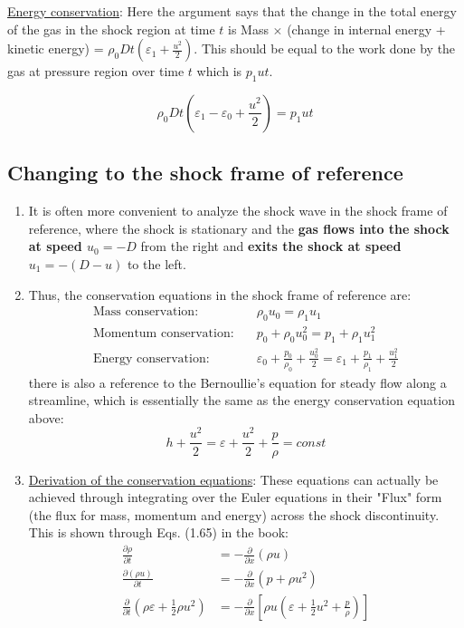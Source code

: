 ﻿\documentclass[11pt]{article}
\begin{document}
\begin{enumerate}
  \underline{Energy conservation}: \newline
  Here the argument says that the change in the total energy of the gas in the shock region at time $t$ is Mass $\times$ (change in internal energy + kinetic energy) = $\rho_0 D t \left( \varepsilon_1 + \frac{u^2}{2} \right)$. This should be equal to the work done by the gas at pressure region over time $t$ which is $p_1 u t$.
  
  \begin{equation}
    \rho_0 D t\left(\varepsilon_1 - \varepsilon_0 + \frac{u^2}{2}\right) = p_1 u t 
  \end{equation}
\end{enumerate}

\subsection{Changing to the shock frame of reference}
\begin{enumerate}
  \item It is often more convenient to analyze the shock wave in the shock frame of reference, where the shock is stationary and the \textbf{gas flows into the shock at speed $u_0 = -D$} from the right and \textbf{exits the shock at speed $u_1=-(D-u)$} to the left.
  \item Thus, the conservation equations in the shock frame of reference are:
  \begin{align}
    \text{Mass conservation:} &\quad \rho_0 u_0 = \rho_1 u_1 \\
    \text{Momentum conservation:} &\quad p_0 + \rho_0 u_0^2 = p_1 + \rho_1 u_1^2 \\
    \text{Energy conservation:} &\quad \varepsilon_0 + \frac{p_0}{\rho_0} + \frac{u_0^2}{2} = \varepsilon_1 + \frac{p_1}{\rho_1} + \frac{u_1^2}{2}
  \end{align}
  there is also a reference to the Bernoullie's equation for steady flow along a streamline, which is essentially the same as the energy conservation equation above:
  \begin{equation}
    h + \frac{u^2}{2} = \varepsilon + \frac{u^2}{2} + \frac{p}{\rho} = const
  \end{equation}
  \item \underline{Derivation of the conservation equations}: \newline
  These equations can actually be achieved through integrating over the Euler equations in their "Flux" form (the flux for mass, momentum and energy) across the shock discontinuity. This is shown through Eqs. (1.65) in the book:
  \begin{align}
    \frac{\partial \rho}{\partial t} &= -\frac{\partial}{\partial x}  (\rho u)  \\
    \frac{\partial (\rho u)}{\partial t} &= -\frac{\partial }{\partial x} (p + \rho u^2)\\
    \frac{\partial}{\partial t} \left( \rho \varepsilon + \frac{1}{2} \rho u^2 \right) &= -\frac{\partial}{\partial x} \left[ \rho u \left(  \varepsilon + \frac{1}{2}  u^2 + \frac{p}{\rho} \right) \right]
  \end{align}
\end{enumerate}
\end{document}

